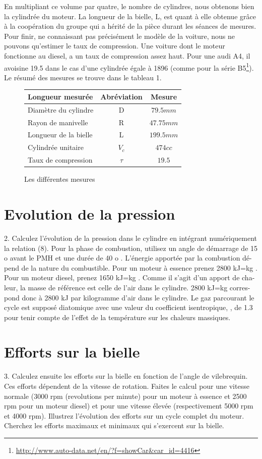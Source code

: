 \documentclass[a4paper,oneside,12pt]{report}
\begin{document}
En multipliant ce volume par quatre, le nombre de cylindres, nous obtenons bien la cylindrée du moteur. La longueur de la bielle, L, est quant à elle obtenue grâce à la coopération du groupe qui a hérité de la pièce durant les séances de mesures. Pour finir, ne connaissant pas précisément le modèle de la voiture, nous ne pouvons qu'estimer le taux de compression. Une voiture dont le moteur fonctionne au diesel, a un taux de compression assez haut. Pour une audi A4, il avoisine 19.5 dans le cas d'une cylindrée égale à 1896 (comme pour la série 
B5\footnote{\url{http://www.auto-data.net/en/?f=showCar&car_id=4416}}). Le résumé des mesures se trouve dans le tableau 1.

\begin{figure}[h]
\centering
\begin{tabular}{|l|c|c|}
  \hline
  Longueur mesurée & Abréviation & Mesure\\
  \hline
  Diamètre du cylindre & D & $79.5mm$ \\
  Rayon de manivelle & R & $47.75mm$\\
  Longueur de la bielle & L & $199.5mm$\\
  Cylindrée unitaire & $V_c$  & $474cc$\\
  Taux de compression & $\tau$ & $19.5$\\
  \hline
\end{tabular}
\caption{Les différentes mesures}
\end{figure}

\section{Evolution de la pression}
2. Calculez l’évolution de la pression dans le cylindre en intégrant numériquement
la relation (8). Pour la phase de combustion, utilisez un angle de démarrage de
15
o
avant le PMH et une durée de
40
o
. L’énergie apportée par la combustion dé-
pend de la nature du combustible. Pour un moteur à essence prenez
2800
kJ=kg
.
Pour un moteur diesel, prenez
1650
kJ=kg
. Comme il s’agit d’un apport de cha-
leur, la masse de référence est celle de l’air dans le cylindre.
2800
kJ=kg
corres-
pond donc à
2800
kJ
par kilogramme d’air dans le cylindre. Le gaz parcourant
le cycle est supposé diatomique avec une valeur du coefficient isentropique,
,
de 1.3 pour tenir compte de l’effet de la température sur les chaleurs massiques.

\section{Efforts sur la bielle}
3. Calculez ensuite les efforts sur la bielle en fonction de l’angle de vilebrequin.
Ces efforts dépendent de la vitesse de rotation. Faites le calcul pour une vitesse
normale (3000 rpm (revolutions per minute) pour un moteur à essence et 2500
rpm pour un moteur diesel) et pour une vitesse élevée (respectivement 5000 rpm
et 4000 rpm). Illustrez l’évolution des efforts sur un cycle complet du moteur.
Cherchez les efforts maximaux et minimaux qui s’exercent sur la bielle.
\end{document}
